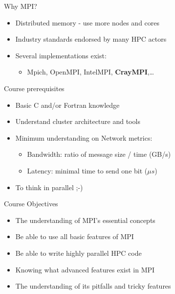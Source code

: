 \documentclass[aspectratio=43]{beamer}
\begin{document}
\cscstitle

\begin{frame}{Why MPI?}
\begin{itemize}
    \item Distributed memory - use more nodes and cores
    \item Industry standards endorsed by many HPC actors
    \item Several implementations exist:
    \begin{itemize}
        \item Mpich, OpenMPI, IntelMPI, \textbf{CrayMPI},\ldots
    \end{itemize}
\end{itemize}
\end{frame}

\begin{frame}{Course prerequisites}
\begin{itemize}
    \item Basic C and/or Fortran knowledge
    \item Understand cluster architecture and tools
    \item Minimum understanding on Network metrics:
    \begin{itemize}
        \item Bandwidth: ratio of message size / time (GB/s)
        \item Latency: minimal time to send one bit ($\mu s$)
    \end{itemize}
    \item To think in parallel ;-)
\end{itemize}
\end{frame}

\begin{frame}{Course Objectives}
\begin{itemize}
\item The understanding of MPI’s essential concepts
\item Be able to use all basic features of MPI
\item Be able to write highly parallel HPC code
\item Knowing what advanced features exist in MPI
\item The understanding of its pitfalls and tricky features
\end{itemize}
\end{frame}
\end{document}
